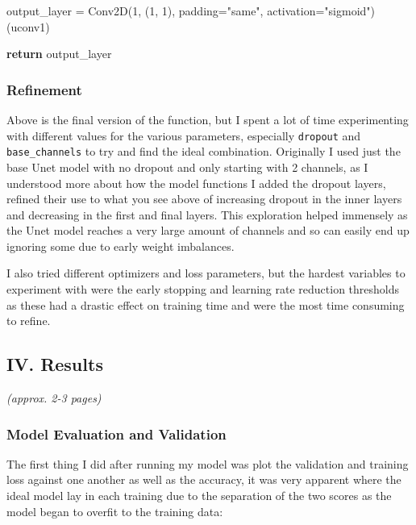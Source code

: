 \documentclass[11pt]{article}
\newenvironment{Shaded}{}{}
\newcommand{\DecValTok}[1]{\textcolor[rgb]{0.25,0.63,0.44}{{#1}}}
\newcommand{\StringTok}[1]{\textcolor[rgb]{0.25,0.44,0.63}{{#1}}}
\newcommand{\NormalTok}[1]{{#1}}
\newcommand{\ControlFlowTok}[1]{\textcolor[rgb]{0.00,0.44,0.13}{\textbf{{#1}}}}
\newcommand{\OperatorTok}[1]{\textcolor[rgb]{0.40,0.40,0.40}{{#1}}}
\begin{document}
\begin{Shaded}
\begin{Highlighting}[]
\NormalTok{    output_layer }\OperatorTok{=}\NormalTok{ Conv2D(}\DecValTok{1}\NormalTok{, (}\DecValTok{1}\NormalTok{, }\DecValTok{1}\NormalTok{), padding}\OperatorTok{=}\StringTok{"same"}\NormalTok{, activation}\OperatorTok{=}\StringTok{"sigmoid"}\NormalTok{)(uconv1)}

    \ControlFlowTok{return}\NormalTok{ output_layer}
\end{Highlighting}
\end{Shaded}

\subsubsection{Refinement}\label{refinement}

Above is the final version of the function, but I spent a lot of time
experimenting with different values for the various parameters,
especially \texttt{dropout} and \texttt{base\_channels} to try and find
the ideal combination. Originally I used just the base Unet model with
no dropout and only starting with 2 channels, as I understood more about
how the model functions I added the dropout layers, refined their use to
what you see above of increasing dropout in the inner layers and
decreasing in the first and final layers. This exploration helped
immensely as the Unet model reaches a very large amount of channels and
so can easily end up ignoring some due to early weight imbalances.

I also tried different optimizers and loss parameters, but the hardest
variables to experiment with were the early stopping and learning rate
reduction thresholds as these had a drastic effect on training time and
were the most time consuming to refine.

\subsection{IV. Results}\label{iv.-results}

\emph{(approx. 2-3 pages)}

\subsubsection{Model Evaluation and
Validation}\label{model-evaluation-and-validation}

The first thing I did after running my model was plot the validation and
training loss against one another as well as the accuracy, it was very
apparent where the ideal model lay in each training due to the
separation of the two scores as the model began to overfit to the
training data:
\end{document}
